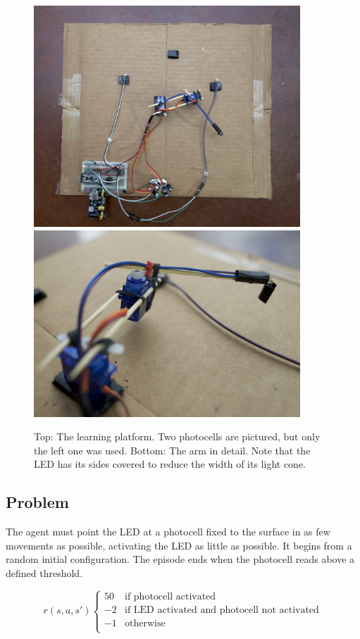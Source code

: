 \documentclass{article}
\begin{document}
	
	\begin{figure}
		\centering
		\includegraphics[width=10cm]{../photos/eagle_small.jpg}
		\includegraphics[width=10cm]{../photos/arm_detail_small.jpg}
		\caption{Top: The learning platform. Two photocells are pictured, but only the left one was used. Bottom: The arm in detail. Note that the LED has its sides covered to reduce the width of its light cone. }
		\label{fig:platform}
	\end{figure}
	
	
	\subsection{Problem}
	
	The agent must point the LED at a photocell fixed to the surface in as few movements as possible, activating the LED as little as possible. It begins from a random initial configuration. The episode ends when the photocell reads above a defined threshold. 
	
	\[ r(s,a,s')  \left\{
	\begin{array}{ll}
		50 & \text{if photocell activated} \\
		-2 & \text{if LED activated and photocell not activated} \\
		-1 & \text{otherwise} \\
	\end{array} 
	\right. \]
	
\end{document}
